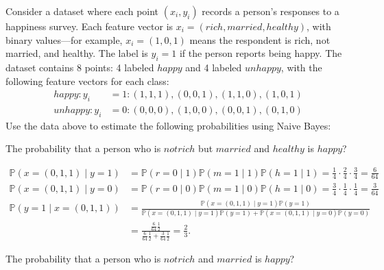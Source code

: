 \documentclass{article}
\renewcommand{\P}{\mathbb{P}}
\begin{document}
\begin{probset}
\begin{prob}
    Consider a dataset where each point $(x_i, y_i)$ records a person's responses to a happiness survey.
    Each feature vector is $x_i = (rich, married, healthy)$, with binary values—for example, $x_i = (1, 0, 1)$ means the respondent is rich, not married, and healthy. The label is $y_i = 1$ if the person reports being happy. The dataset contains 8 points: 4 labeled $happy$ and 4 labeled $unhappy$, with the following feature vectors for each class:
    \begin{align*}
        happy : y_i &= 1 : (1, 1, 1), (0, 0, 1), (1, 1, 0), (1, 0, 1) \\
        unhappy : y_i &= 0 : (0, 0, 0), (1, 0, 0), (0, 0, 1), (0, 1, 0)
    \end{align*}
    Use the data above to estimate the following probabilities using Naive Bayes:

    \begin{subprobset}
        \begin{subprob}
            The probability that a person who is $not rich$ but $married$ and $healthy$ is $happy$?

            \begin{soln}
                \begin{align*}
                    \P(x=(0,1,1)\mid y=1) &= \P(r=0\mid1)\P(m=1\mid1)\P(h=1\mid1) = \frac14 \cdot \frac24 \cdot \frac34 = \frac{6}{64} \\
                    \P(x=(0,1,1)\mid y=0) &= \P(r=0\mid0)\P(m=1\mid0)\P(h=1\mid0) = \frac34 \cdot \frac14 \cdot \frac14 = \frac{3}{64} \\
                    \P(y=1\mid x = (0,1,1)) &= \frac{\P(x=(0,1,1)\mid y=1)\P(y=1)}{\P(x=(0,1,1)\mid y=1)\P(y=1) + \P(x=(0,1,1)\mid y=0)\P(y=0)} \\
                    &= \frac{\tfrac{6}{64}\tfrac{1}{2}}{\tfrac{6}{64}\tfrac{1}{2} + \tfrac{3}{64}\tfrac{1}{2}} = \frac23.
                \end{align*}
            \end{soln}
        \end{subprob}

        \begin{subprob}
            The probability that a person who is $not rich$ and $married$ is $happy$?


\end{subprob}
\end{subprobset}
\end{prob}
\end{probset}
\end{document}
